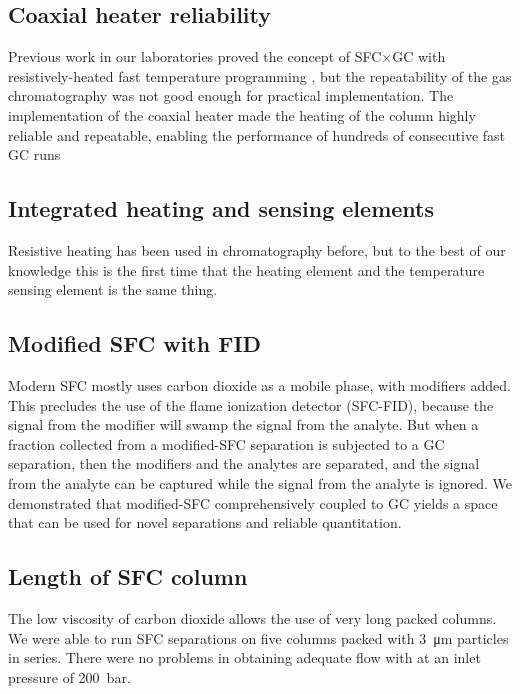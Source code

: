 \subsection{Coaxial heater reliability}

Previous work in our laboratories proved the concept of SFC×GC with
resistively-heated fast temperature programming \autocite{Venter2004,
Venter2006}, but the repeatability of the gas chromatography was not good enough
for practical implementation. The implementation of the coaxial heater made the
heating of the column highly reliable and repeatable, enabling the performance
of hundreds of consecutive fast GC runs

\subsection{Integrated heating and sensing elements}

Resistive heating has been used in chromatography before, but to the best of our
knowledge this is the first time that the heating element and the temperature
sensing element is the same thing.

\subsection{Modified SFC with FID}

Modern SFC mostly uses carbon dioxide as a mobile phase, with modifiers added.
This precludes the use of the flame ionization detector (SFC-FID), because the
signal from the modifier will swamp the signal from the analyte. But when a
fraction collected from a modified-SFC separation is subjected to a GC
separation, then the modifiers and the analytes are separated, and the signal
from the analyte can be captured while the signal from the analyte is ignored.
We demonstrated that modified-SFC comprehensively coupled to GC yields a space
that can be used for novel separations and reliable quantitation.

\subsection{Length of SFC column}

The low viscosity of carbon dioxide allows the use of very long packed columns.
We were able to run SFC separations on five columns packed with
\SI{3}{\micro\metre} particles in series. There were no problems in obtaining
adequate flow with at an inlet pressure of \SI{200}{\bar}.

